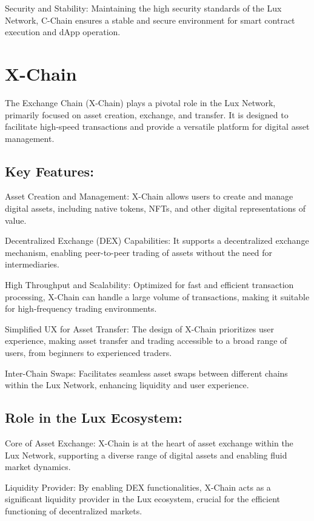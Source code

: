 \documentclass[11pt]{article}
\begin{document}
Security and Stability: Maintaining the high security standards of the Lux Network, C-Chain ensures a stable and secure environment for smart contract execution and dApp operation.


\section{X-Chain}

The Exchange Chain (X-Chain) plays a pivotal role in the Lux Network, primarily focused on asset creation, exchange, and transfer. It is designed to facilitate high-speed transactions and provide a versatile platform for digital asset management.


\subsection{Key Features:}

Asset Creation and Management: X-Chain allows users to create and manage digital assets, including native tokens, NFTs, and other digital representations of value.


Decentralized Exchange (DEX) Capabilities: It supports a decentralized exchange mechanism, enabling peer-to-peer trading of assets without the need for intermediaries.


High Throughput and Scalability: Optimized for fast and efficient transaction processing, X-Chain can handle a large volume of transactions, making it suitable for high-frequency trading environments.


Simplified UX for Asset Transfer: The design of X-Chain prioritizes user experience, making asset transfer and trading accessible to a broad range of users, from beginners to experienced traders.


Inter-Chain Swaps: Facilitates seamless asset swaps between different chains within the Lux Network, enhancing liquidity and user experience.


\subsection{Role in the Lux Ecosystem:}

Core of Asset Exchange: X-Chain is at the heart of asset exchange within the Lux Network, supporting a diverse range of digital assets and enabling fluid market dynamics.


Liquidity Provider: By enabling DEX functionalities, X-Chain acts as a significant liquidity provider in the Lux ecosystem, crucial for the efficient functioning of decentralized markets.
\end{document}
